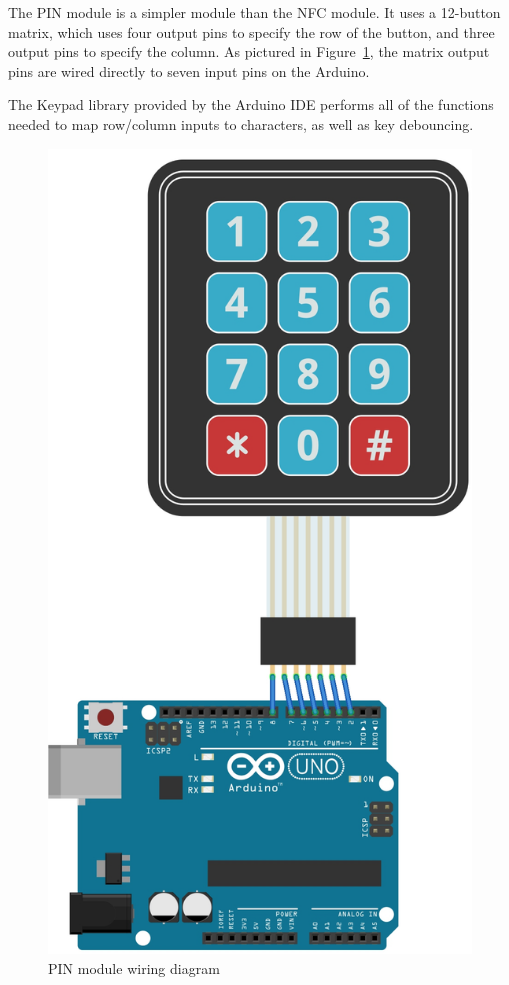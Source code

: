 \documentclass[12pt]{report}
\begin{document}
The PIN module is a simpler module than the NFC module. It uses a 12-button matrix, which uses four output pins to 
specify the row of the button, and three output pins to specify the column. As pictured in 
Figure~\ref{fig:pin-module-wiring}, the matrix output pins are wired directly to seven input pins on the Arduino.

The Keypad library provided by the Arduino IDE performs all of the functions needed to map row/column inputs to 
characters, as well as key debouncing. 

\begin{figure}
    \centering
    \includegraphics{Diagrams/Hardware-Diagrams/pin_module}
    \caption{PIN module wiring diagram}
    \label{fig:pin-module-wiring}
\end{figure}
\end{document}
